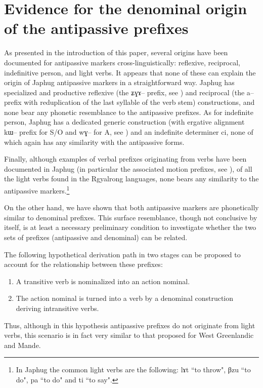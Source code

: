 \documentclass[oldfontcommands,oneside,a4paper,11pt]{article}
\newcommand{\ipa}[1]{{\phon \mbox{#1}}} %
\begin{document}
\section{Evidence for the denominal origin of the  antipassive prefixes} \label{sec:evidence}

As presented in the introduction of this paper, several origins have been documented for antipassive markers cross-linguistically: reflexive, reciprocal, indefinitive person, and light verbs. It appears that none of these   can explain the origin of Japhug antipassive markers in a straightforward way. Japhug has   specialized and productive reflexive (the \ipa{ʑɣɤ--} prefix, see \citealt{jacques10refl}) and reciprocal (the \ipa{a}-- prefix with reduplication of the last syllable of the verb stem) constructions, and none bear any phonetic resemblance to the antipassive prefixes. As for indefinite person, Japhug has a dedicated generic construction (with ergative alignment \ipa{kɯ}-- prefix for S/O and \ipa{wɣ}-- for A, see \citealt{jacques12demotion}) and an indefinite determiner \ipa{ci}, none of which again has  any similarity with the antipassive forms. 

Finally,  although  examples of verbal prefixes originating from verbs have been documented in Japhug (in particular the associated motion prefixes, see \citealt{jacques.harmonization}), of all the light verbs found  in the Rgyalrong languages, none bears any similarity to the antipassive markers.\footnote{In Japhug the common light verbs are the following: \ipa{lɤt} ``to throw", \ipa{βzu} ``to do", \ipa{pa} ``to do" and \ipa{ti} ``to say".}

On the other hand, we have shown that  both antipassive markers are phonetically similar to denominal prefixes. This surface resemblance, though not conclusive by itself, is at least a necessary preliminary condition to investigate whether the two sets of prefixes (antipassive and denominal) can be related.


The following hypothetical  derivation path in two stages  can be proposed to account for the relationship between these prefixes:
\begin{enumerate}


\item A transitive verb is nominalized into an action nominal. 

\item The action nominal is turned into a verb by a denominal construction deriving intransitive verbs.  

\end{enumerate}
Thus, although in this hypothesis antipassive prefixes do not originate from light verbs, this scenario is in fact very similar to that proposed for West Greenlandic and Mande.
\end{document}
